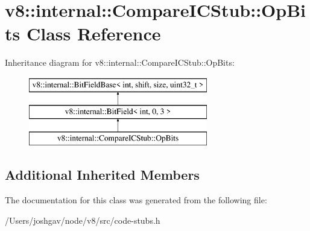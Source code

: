 \hypertarget{classv8_1_1internal_1_1_compare_i_c_stub_1_1_op_bits}{}\section{v8\+:\+:internal\+:\+:Compare\+I\+C\+Stub\+:\+:Op\+Bits Class Reference}
\label{classv8_1_1internal_1_1_compare_i_c_stub_1_1_op_bits}
Inheritance diagram for v8\+:\+:internal\+:\+:Compare\+I\+C\+Stub\+:\+:Op\+Bits\+:\begin{figure}[H]
\begin{center}
\leavevmode
\includegraphics[height=3.000000cm]{classv8_1_1internal_1_1_compare_i_c_stub_1_1_op_bits}
\end{center}
\end{figure}
\subsection*{Additional Inherited Members}


The documentation for this class was generated from the following file\+:\begin{DoxyCompactItemize}
\item 
/\+Users/joshgav/node/v8/src/code-\/stubs.\+h\end{DoxyCompactItemize}
